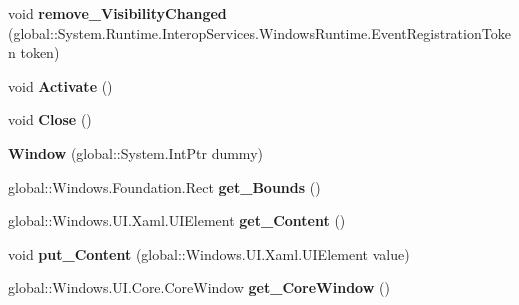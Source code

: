 \begin{DoxyCompactItemize}
\item 
\mbox{\label{class_windows_1_1_u_i_1_1_xaml_1_1_window_ad984391809f48d0412161ff575cd570d}} 
void {\bfseries remove\+\_\+\+Visibility\+Changed} (global\+::\+System.\+Runtime.\+Interop\+Services.\+Windows\+Runtime.\+Event\+Registration\+Token token)
\item 
\mbox{\label{class_windows_1_1_u_i_1_1_xaml_1_1_window_a92d7288cb5bc807e56222e347e2e7603}} 
void {\bfseries Activate} ()
\item 
\mbox{\label{class_windows_1_1_u_i_1_1_xaml_1_1_window_ab6b6a8e512a08f5ba35b8bc367dfeea8}} 
void {\bfseries Close} ()
\item 
\mbox{\label{class_windows_1_1_u_i_1_1_xaml_1_1_window_a2f884c667c9bd45a983c8611d71c365b}} 
{\bfseries Window} (global\+::\+System.\+Int\+Ptr dummy)
\item 
\mbox{\label{class_windows_1_1_u_i_1_1_xaml_1_1_window_a3b4023c9ffd4210037266cde25034d90}} 
global\+::\+Windows.\+Foundation.\+Rect {\bfseries get\+\_\+\+Bounds} ()
\item 
\mbox{\label{class_windows_1_1_u_i_1_1_xaml_1_1_window_ae8eec75ce505d25ba6c2553adc1784b5}} 
global\+::\+Windows.\+U\+I.\+Xaml.\+U\+I\+Element {\bfseries get\+\_\+\+Content} ()
\item 
\mbox{\label{class_windows_1_1_u_i_1_1_xaml_1_1_window_ad4e7eb6e2bbbcc9db175cc0467fa6060}} 
void {\bfseries put\+\_\+\+Content} (global\+::\+Windows.\+U\+I.\+Xaml.\+U\+I\+Element value)
\item 
\mbox{\label{class_windows_1_1_u_i_1_1_xaml_1_1_window_a4ea24c3c21a169c23a2ae6ca99188f43}} 
global\+::\+Windows.\+U\+I.\+Core.\+Core\+Window {\bfseries get\+\_\+\+Core\+Window} ()
\item 
\mbox{\label{class_windows_1_1_u_i_1_1_xaml_1_1_window_a209f50e7cf5593a7150291903f99e541}} 

\end{DoxyCompactItemize}
